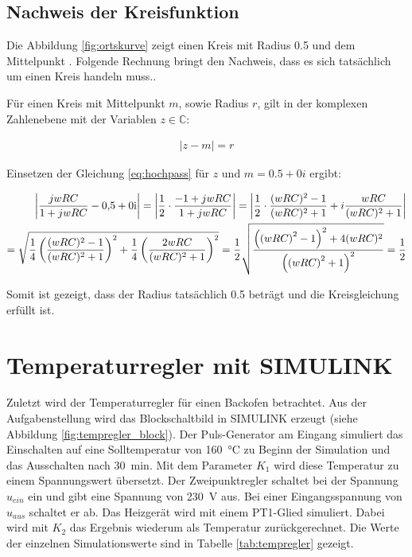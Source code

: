 \documentclass[
    paper=a4,
    fontsize=10pt,
    DIV=13,
    oneside,
]{scrartcl}
\begin{document}
    \subsection{Nachweis der Kreisfunktion}

    Die Abbildung \ref{fig:ortskurve} zeigt einen Kreis mit Radius 0.5 und dem Mittelpunkt . Folgende Rechnung bringt den Nachweis, dass es sich tatsächlich um einen Kreis handeln muss..

    Für einen Kreis mit Mittelpunkt \(m\), sowie Radius \(r\), gilt in der komplexen Zahlenebene mit der Variablen \(z \in \mathbb{C}\):
    
    \begin{align}
        \left| z - m \right| = r
    \end{align}

    Einsetzen der Gleichung \eqref{eq:hochpass} für \(z\) und \(m= 0.5 +0i\) ergibt:

    \begin{align}
        \left|\frac{jwRC}{1+jwRC} - \complexnum{0.5 +0i} \right| = \left| \frac{1}{2} \cdot \frac{-1 + jwRC}{1 + jwRC} \right| = \left| \frac{1}{2} \cdot \frac{(wRC)^2 - 1}{(wRC)^2 + 1} + i \frac{wRC}{(wRC)^2 + 1} \right| \\
        = \sqrt{ \frac{1}{4} \left( \frac{(wRC)^2 - 1}{(wRC)^2 + 1} \right)^2 + \frac{1}{4} \left( \frac{2wRC}{(wRC)^2 + 1} \right)^2} = \frac{1}{2} \sqrt{ \frac{ \left(\left(wRC\right)^2 - 1\right)^2 + 4 (wRC)^2 }{\left(\left(wRC\right)^2 + 1\right)^2} } = \frac{1}{2}
    \end{align}

    Somit ist gezeigt, dass der Radius tatsächlich 0.5 beträgt und die Kreisgleichung erfüllt ist.

\section{Temperaturregler mit SIMULINK}
    Zuletzt wird der Temperaturregler für einen Backofen betrachtet. Aus der Aufgabenstellung \cite{versuch1} wird das Blockschaltbild in SIMULINK erzeugt (siehe Abbildung \ref{fig:tempregler_block}). Der Puls-Generator am Eingang simuliert das Einschalten auf eine Solltemperatur von \SI{160}{\celsius} zu Beginn der Simulation und das Ausschalten nach \SI{30}{\minute}. Mit dem Parameter \(K_1\) wird diese Temperatur zu einem Spannungswert übersetzt. Der Zweipunktregler schaltet bei der Spannung \(u_{ein}\) ein und gibt eine Spannung von \SI{230}{\volt} aus. Bei einer Eingangsspannung von \(u_{aus}\) schaltet er ab. Das Heizgerät wird mit einem PT1-Glied simuliert. Dabei wird mit \(K_2\) das Ergebnis wiederum als Temperatur zurückgerechnet. Die Werte der einzelnen Simulationswerte sind in Tabelle \ref{tab:tempregler} gezeigt. 
\end{document}
